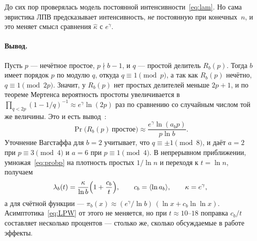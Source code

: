 \documentclass[11pt,a4paper]{article}
\theoremstyle{plain}
\theoremstyle{remark}
\newcommand{\Rb}{R_b}
\newcommand{\eg}{e^{\gamma}}
\begin{document}
До сих пор проверялась модель постоянной интенсивности~\eqref{eq:lam}. Но сама
эвристика ЛПВ предсказывает интенсивность, \emph{не} постоянную при конечных~$n$,
и это меняет смысл сравнения $\hat\kappa$ с $\eg$.

\paragraph{Вывод.} Пусть $p$ --- нечётное простое, $p\nmid b-1$, и $q$ --- простой делитель
$\Rb(p)$. Тогда $b$ имеет порядок $p$ по модулю $q$, откуда $q\equiv1\pmod p$, а
так как $\Rb(p)$ нечётно, $q\equiv1\pmod{2p}$. Значит, у $\Rb(p)$ нет простых
делителей меньше $2p+1$, и по теореме Мертенса вероятность простоты
увеличивается в $\prod_{q<2p}(1-1/q)^{-1}\approx\eg\ln(2p)$ раз по сравнению со
случайным числом той же величины. Это и есть вывод~\cite{wagstaff1983,t5k}:
\begin{equation}\label{eq:probp}
\Pr\bigl(\Rb(p)\ \text{простое}\bigr)\approx\frac{\eg\ln(a_bp)}{p\ln b}.
\end{equation}
Уточнение Вагстаффа для $b=2$ учитывает, что $q\equiv\pm1\pmod8$, и даёт $a=2$ при
$p\equiv3\pmod4$ и $a=6$ при $p\equiv1\pmod4$. В непрерывном приближении,
умножая~\eqref{eq:probp} на плотность простых $1/\ln n$ и переходя к $t=\ln n$,
получаем
\begin{equation}\label{eq:lam2}
\lambda_b(t)=\frac{\kappa}{\ln b}\Bigl(1+\frac{c_b}{t}\Bigr),\qquad
c_b=\langle\ln a_b\rangle,\qquad \kappa=\eg,
\end{equation}
а для счётной функции --- $\pi_b(x)\approx(\eg/\ln b)\,(\ln x+c_b\ln\ln x)$.
Асимптотика~\eqref{eq:LPW} от этого не меняется, но при $t\approx10$--$18$ поправка
$c_b/t$ составляет несколько процентов --- столько же, сколько обсуждаемые в работе
эффекты.
\end{document}

